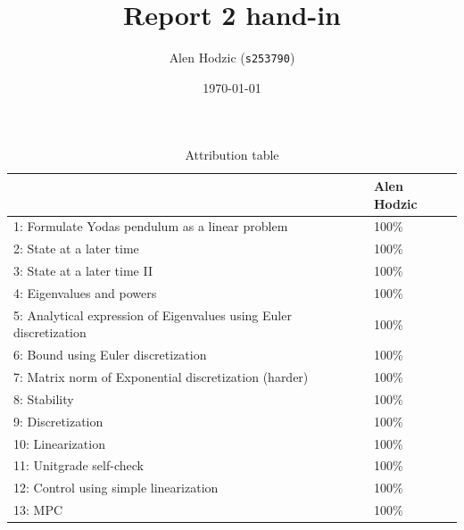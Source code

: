\documentclass[12pt,twoside]{article}
\title{ Report 2 hand-in }
\date{ \today }
\author{Alen Hodzic (\texttt{s253790}) }
\begin{document}
\maketitle

\begin{table}[ht!]
\caption{Attribution table}
\begin{tabular}{ll}
\toprule
                                                                    & Alen Hodzic \\
\midrule
 1: Formulate Yodas pendulum as a linear problem                    & 100\%  \\
 2: State at a later time                                           & 100\%  \\
 3: State at a later time II                                        & 100\%  \\
 4: Eigenvalues and powers                                          & 100\%  \\
 5: Analytical expression of Eigenvalues using Euler discretization & 100\%  \\
 6: Bound using Euler discretization                                & 100\%  \\
 7: Matrix norm of Exponential discretization (harder)              & 100\%  \\
 8: Stability                                                       & 100\%  \\
 9: Discretization                                                  & 100\%  \\
 10: Linearization                                                  & 100\%  \\
 11: Unitgrade self-check                                           & 100\%  \\
 12: Control using simple linearization                             & 100\%  \\
 13: MPC                                                            & 100\%  \\
\bottomrule
\end{tabular}
\end{table}

\end{document}
